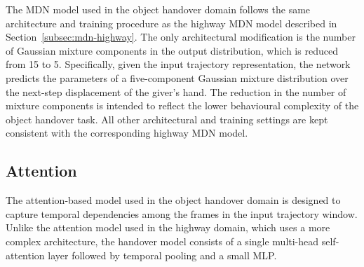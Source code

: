 \documentclass[journal]{IEEEtran}
\begin{document}
The MDN model used in the object handover domain follows the same architecture and training procedure as the highway MDN model described in Section~\ref{subsec:mdn-highway}. The only architectural modification is the number of Gaussian mixture components in the output distribution, which is reduced from 15 to 5. Specifically, given the input trajectory representation, the network predicts the parameters of a five-component Gaussian mixture distribution over the next-step displacement of the giver's hand. The reduction in the number of mixture components is intended to reflect the lower behavioural complexity of the object handover task. All other architectural and training settings are kept consistent with the corresponding highway MDN model.

\subsection{Attention}

The attention-based model used in the object handover domain is designed to capture temporal dependencies among the frames in the input trajectory window. Unlike the attention model used in the highway domain, which uses a more complex architecture, the handover model consists of a single multi-head self-attention layer followed by temporal pooling and a small MLP.
\end{document}
